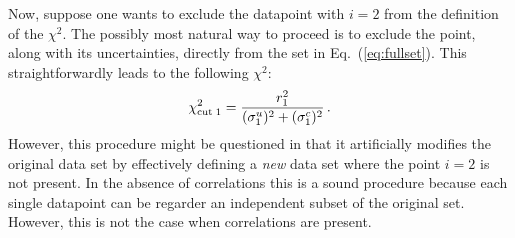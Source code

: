 \documentclass[10pt,a4paper]{article}
\begin{document}
Now, suppose one wants to exclude the datapoint with $i=2$ from the
definition of the $\chi^2$. The possibly most natural way to proceed
is to exclude the point, along with its uncertainties, directly from
the set in Eq.~(\ref{eq:fullset}). This straightforwardly leads to the
following $\chi^2$:
\begin{equation}\label{eq:redchi21}
{\chi}_{\rm cut\;1}^2 = \frac{r_1^2}{(\sigma_1^u)^2+ (\sigma_1^c)^2}\,.
\end{equation}
However, this procedure might be questioned in that it artificially
modifies the original data set by effectively defining a \textit{new}
data set where the point $i=2$ is not present. In the absence of
correlations this is a sound procedure because each single datapoint
can be regarder an independent subset of the original
set. However, this is not the case when correlations are present.
\end{document}
